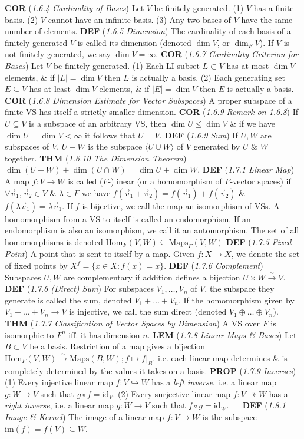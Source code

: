 \documentclass{article}
\newcommand{\wde}[1]{\textcolor{defc}{\textbf{DEF}} (\textcolor{namec}{\textit{#1}})}
\newcommand{\wl}[1]{\textcolor{lemc}{\textbf{LEM}} (\textcolor{namec}{\textit{#1}})}
\newcommand{\wc}[1]{\textcolor{corc}{\textbf{COR}} (\textcolor{namec}{\textit{#1}})}
\newcommand{\wpr}[1]{\textcolor{propc}{\textbf{PROP}} (\textcolor{namec}{\textit{#1}})}
\newcommand{\wt}[1]{\textcolor{thmc}{\textbf{THM}} (\textcolor{namec}{\textit{#1}})}
\newcommand{\Maps}[0]{\text{Maps}}
\newcommand{\Hom}[0]{\text{Hom}}
\newcommand{\id}[0]{\text{id}}
\newcommand{\im}[0]{\text{im}}
\newcommand{\iso}[0]{\stackrel{\sim}{\to}}
\begin{document}
\begin{multicols}{2}
  \wc{1.6.4 Cardinality of Bases} Let $V$ be finitely-generated.
  (1) $V$ has a finite basis.
  (2) $V$ cannot have an infinite basis.
  (3) Any two bases of $V$ have the same number of elements.
  \wde{1.6.5 Dimension} The cardinality of each basis of a finitely generated $V$ is called its dimension (denoted $\dim V$, or $\dim_{F}V$). If $V$ is not finitely generated, we say $\dim V = \infty$.
  \wc{1.6.7 Cardinality Criterion for Bases} Let $V$ be finitely generated.
  (1) Each LI subset $L \subset V$ has at most $\dim V$ elements, \& if $|L| = \dim V$ then $L$ is actually a basis.
  (2) Each generating set $E \subseteq V$ has at least $\dim V$ elements, \& if $|E| = \dim V$ then $E$ is actually a basis.
  \wc{1.6.8 Dimension Estimate for Vector Subspaces} A proper subspace of a finite VS has itself a strictly smaller dimension.
  \wc{1.6.9 Remark on 1.6.8} If $U \subseteq V$ is a subspace of an arbitrary VS, then $\dim U \le \dim V$ \& if we have $\dim U = \dim V < \infty$ it follows that $U = V$.
  \wde{1.6.9 Sum} If $U,W$ are subspaces of $V$, $U + W$ is the subspace $\langle U \cup W \rangle$ of $V$ generated by $U$ \& $W$ together.
  \wt{1.6.10 The Dimension Theorem} $\dim(U + W) + \dim(U \cap W) = \dim U + \dim W$.
  \wde{1.7.1 Linear Map} A map $f : V \to W$ is called ($F$-)linear (or a homomorphism of $F$-vector spaces) if $\forall \vec{v}_{1}, \vec{v}_{2} \in V$ \& $\lambda \in F$ we have $f(\vec{v}_{1} + \vec{v}_{2}) = f(\vec{v}_{1}) + f(\vec{v}_{2})$ \& $f(\lambda \vec{v}_{1}) = \lambda \vec{v}_{1}$. If $f$ is bijective, we call the map an isomorphism of VSs. A homomorphism from a VS to itself is called an endomorphism. If an endomorphism is also an isomorphism, we call it an automorphism. The set of all homomorphisms is denoted $\Hom_{F}(V,W) \subseteq \Maps_{F}(V,W)$
  \wde{1.7.5 Fixed Point} A point that is sent to itself by a map. Given $f : X \to X$, we denote the set of fixed points by $X^{f} = \{x \in X : f(x) = x\}$.
  \wde{1.7.6 Complement} Subspaces $U,W$ are complementary if addition defines a bijection $U \times W \iso V$.
  \wde{1.7.6 (Direct) Sum} For subspaces $V_{1}, \dots, V_{n}$ of $V$, the subspace they generate is called the sum, denoted $V_{1} + \dots + V_{n}$. If the homomorphism given by $V_{1} + \dots + V_{n} \to V$ is injective, we call the sum direct (denoted $V_{1} \oplus \dots \oplus V_{n}$).
  \wt{1.7.7 Classification of Vector Spaces by Dimension} A VS over $F$ is isomorphic to $F^{n}$ iff. it has dimension $n$.
  \wl{1.7.8 Linear Maps \& Bases} Let $B \subset V$ be a basis. Restriction of a map gives a bijection $\Hom_{F}(V, W) \iso \Maps(B, W); f \mapsto f |_{B}$. i.e. each linear map determines \& is completely determined by the values it takes on a basis.
  \wpr{1.7.9 Inverses}
  (1) Every injective linear map $f : V \hookrightarrow W$ has a \emph{left inverse}, i.e. a linear map $g : W \to V$ such that $g \circ f = \id_{V}$.
  (2) Every surjective linear map $f : V \twoheadrightarrow W$ has a \emph{right inverse}, i.e. a linear map $g : W \to V$ such that $f \circ g = \id_{W}$.
\ \
  \wde{1.8.1 Image \& Kernel} The image of a linear map $f : V \to W$ is the subspace $\im(f) = f(V) \subseteq W$.
\end{multicols}
\end{document}

